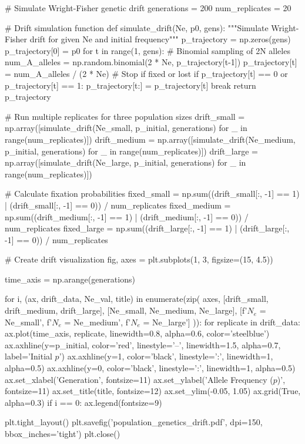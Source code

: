 \documentclass[11pt,a4paper]{article}
\begin{document}
\begin{pycode}
# Simulate Wright-Fisher genetic drift
generations = 200
num_replicates = 20

# Drift simulation function
def simulate_drift(Ne, p0, gens):
    """Simulate Wright-Fisher drift for given Ne and initial frequency"""
    p_trajectory = np.zeros(gens)
    p_trajectory[0] = p0
    for t in range(1, gens):
        # Binomial sampling of 2N alleles
        num_A_alleles = np.random.binomial(2 * Ne, p_trajectory[t-1])
        p_trajectory[t] = num_A_alleles / (2 * Ne)
        # Stop if fixed or lost
        if p_trajectory[t] == 0 or p_trajectory[t] == 1:
            p_trajectory[t:] = p_trajectory[t]
            break
    return p_trajectory

# Run multiple replicates for three population sizes
drift_small = np.array([simulate_drift(Ne_small, p_initial, generations) for _ in range(num_replicates)])
drift_medium = np.array([simulate_drift(Ne_medium, p_initial, generations) for _ in range(num_replicates)])
drift_large = np.array([simulate_drift(Ne_large, p_initial, generations) for _ in range(num_replicates)])

# Calculate fixation probabilities
fixed_small = np.sum((drift_small[:, -1] == 1) | (drift_small[:, -1] == 0)) / num_replicates
fixed_medium = np.sum((drift_medium[:, -1] == 1) | (drift_medium[:, -1] == 0)) / num_replicates
fixed_large = np.sum((drift_large[:, -1] == 1) | (drift_large[:, -1] == 0)) / num_replicates

# Create drift visualization
fig, axes = plt.subplots(1, 3, figsize=(15, 4.5))

time_axis = np.arange(generations)

for i, (ax, drift_data, Ne_val, title) in enumerate(zip(
    axes,
    [drift_small, drift_medium, drift_large],
    [Ne_small, Ne_medium, Ne_large],
    [f'$N_e$ = {Ne_small}', f'$N_e$ = {Ne_medium}', f'$N_e$ = {Ne_large}']
)):
    for replicate in drift_data:
        ax.plot(time_axis, replicate, linewidth=0.8, alpha=0.6, color='steelblue')
    ax.axhline(y=p_initial, color='red', linestyle='--', linewidth=1.5, alpha=0.7, label='Initial $p$')
    ax.axhline(y=1, color='black', linestyle=':', linewidth=1, alpha=0.5)
    ax.axhline(y=0, color='black', linestyle=':', linewidth=1, alpha=0.5)
    ax.set_xlabel('Generation', fontsize=11)
    ax.set_ylabel('Allele Frequency ($p$)', fontsize=11)
    ax.set_title(title, fontsize=12)
    ax.set_ylim(-0.05, 1.05)
    ax.grid(True, alpha=0.3)
    if i == 0:
        ax.legend(fontsize=9)

plt.tight_layout()
plt.savefig('population_genetics_drift.pdf', dpi=150, bbox_inches='tight')
plt.close()
\end{pycode}
\end{document}
